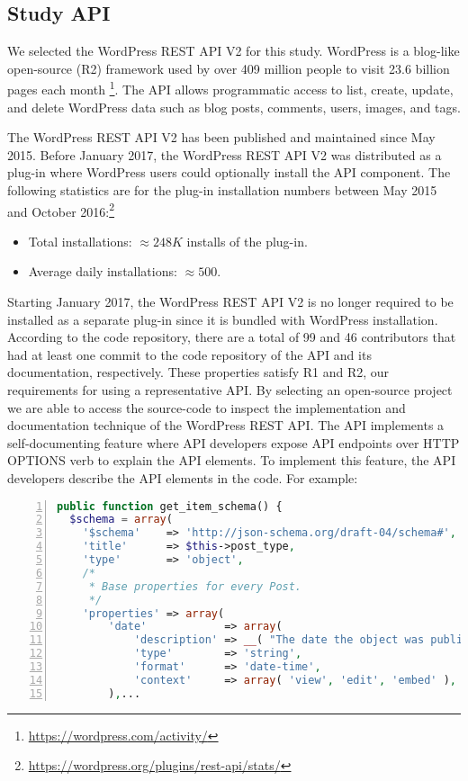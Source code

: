 \subsection{Study API} %

We selected the WordPress REST API V2 for this study. WordPress is a blog-like open-source (R2) framework used by over 409 million people to visit 23.6 billion pages each month \footnote{\url{https://wordpress.com/activity/}}. The API allows programmatic access to list, create, update, and delete WordPress data such as blog posts, comments, users, images, and tags.

The WordPress REST API V2 has been published and maintained since May 2015. Before January 2017, the WordPress REST API V2 was distributed as a plug-in where WordPress users could optionally install the API component. The following statistics are for the plug-in installation numbers between May 2015 and October 2016:\footnote{\url{https://wordpress.org/plugins/rest-api/stats/}}

\begin{itemize}
  \item Total installations: $ \approx 248K$ installs of the plug-in.
  \item Average daily installations: $ \approx 500$.
\end{itemize}

Starting January 2017, the WordPress REST API V2 is no longer required to be installed as a separate plug-in since it is bundled with WordPress installation. According to the code repository, there are a total of 99 and 46 contributors that had at least one commit to the code repository of the API and its documentation, respectively. These properties satisfy R1 and R2, our requirements for using a representative API. By selecting an open-source project we are able to access the source-code to inspect the implementation and documentation technique of the WordPress REST API. The API implements a self-documenting feature where API developers expose API endpoints over HTTP OPTIONS verb to explain the API elements. To implement this feature, the API developers describe the API elements in the code. For example:

\lstset{basicstyle=\ttfamily\footnotesize,breaklines=true}
\begin{lstlisting}[language=php,showspaces=false,showstringspaces=false,numbers=left,xleftmargin=2em,caption={Example of self-documenting API Code in PHP},label=wordpress_code]
public function get_item_schema() {
  $schema = array(
    '$schema'    => 'http://json-schema.org/draft-04/schema#',
    'title'      => $this->post_type,
    'type'       => 'object',
    /*
     * Base properties for every Post.
     */
    'properties' => array(
        'date'            => array(
            'description' => __( "The date the object was published, in the site's timezone." ),
            'type'        => 'string',
            'format'      => 'date-time',
            'context'     => array( 'view', 'edit', 'embed' ),
        ),...
\end{lstlisting}

